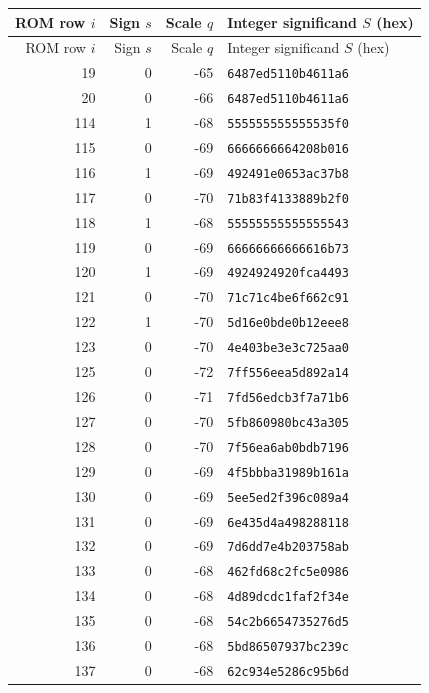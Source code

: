 {\footnotesize
\begin{longtable}{@{}rrrl@{}}
\toprule
ROM row $i$ & Sign $s$ & Scale $q$ & Integer significand $S$ (hex) \\
\midrule
\endfirsthead
\toprule
ROM row $i$ & Sign $s$ & Scale $q$ & Integer significand $S$ (hex) \\
\midrule
\endhead
19 & 0 & -65 & \texttt{6487ed5110b4611a6} \\
20 & 0 & -66 & \texttt{6487ed5110b4611a6} \\
\midrule
114 & 1 & -68 & \texttt{555555555555535f0} \\
115 & 0 & -69 & \texttt{6666666664208b016} \\
116 & 1 & -69 & \texttt{492491e0653ac37b8} \\
117 & 0 & -70 & \texttt{71b83f4133889b2f0} \\
\midrule
118 & 1 & -68 & \texttt{55555555555555543} \\
119 & 0 & -69 & \texttt{66666666666616b73} \\
120 & 1 & -69 & \texttt{4924924920fca4493} \\
121 & 0 & -70 & \texttt{71c71c4be6f662c91} \\
122 & 1 & -70 & \texttt{5d16e0bde0b12eee8} \\
123 & 0 & -70 & \texttt{4e403be3e3c725aa0} \\
\midrule
125 & 0 & -72 & \texttt{7ff556eea5d892a14} \\
126 & 0 & -71 & \texttt{7fd56edcb3f7a71b6} \\
127 & 0 & -70 & \texttt{5fb860980bc43a305} \\
128 & 0 & -70 & \texttt{7f56ea6ab0bdb7196} \\
129 & 0 & -69 & \texttt{4f5bbba31989b161a} \\
130 & 0 & -69 & \texttt{5ee5ed2f396c089a4} \\
131 & 0 & -69 & \texttt{6e435d4a498288118} \\
132 & 0 & -69 & \texttt{7d6dd7e4b203758ab} \\
133 & 0 & -68 & \texttt{462fd68c2fc5e0986} \\
134 & 0 & -68 & \texttt{4d89dcdc1faf2f34e} \\
135 & 0 & -68 & \texttt{54c2b6654735276d5} \\
136 & 0 & -68 & \texttt{5bd86507937bc239c} \\
137 & 0 & -68 & \texttt{62c934e5286c95b6d} \\

\end{longtable}}
